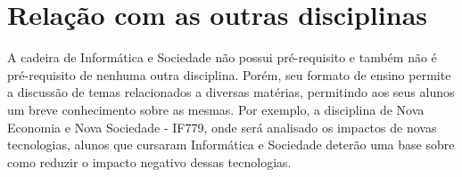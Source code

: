 \documentclass[a4 paper, 10pt]{article}
\begin{document}
\section{Relação com as outras disciplinas}
\quad A cadeira de Informática e Sociedade não possui pré-requisito e também não é pré-requisito de nenhuma outra disciplina.\cite{perfil} Porém, seu formato de ensino permite a discussão de temas relacionados a diversas matérias, permitindo aos seus alunos um breve conhecimento sobre as mesmas. Por exemplo, a disciplina de Nova Economia e Nova Sociedade - IF779, onde será analisado os impactos de novas tecnologias, alunos que cursaram Informática e Sociedade deterão uma base sobre como reduzir o impacto negativo dessas tecnologias.



\end{document}

